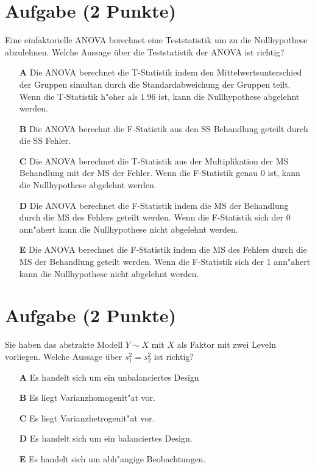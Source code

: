 \documentclass[a4paper, 10pt]{scrartcl}\usepackage[]{graphicx}\usepackage[]{xcolor}
\begin{document}
\section{Aufgabe \hfill (2 Punkte)}

Eine einfaktorielle ANOVA berechnet eine Teststatistik um zu die Nullhypothese abzulehnen. Welche Aussage {\"u}ber die Teststatistik der ANOVA ist richtig?



\begin{enumerate}
\item [\textbf{A} \msquare] Die ANOVA berechnet die T-Statistik indem den Mittelwertsunterschied der Gruppen simultan durch die Standardabweichung der Gruppen teilt. Wenn die T-Statistik h{"o}her als 1.96 ist, kann die Nullhypothese abgelehnt werden.
\item [\textbf{B} \msquare] Die ANOVA berechnt die F-Statistik aus den SS Behandlung geteilt durch die SS Fehler.
\item [\textbf{C} \msquare] Die ANOVA berechnet die T-Statistik aus der Multiplikation der MS Behandlung mit der MS der Fehler. Wenn die F-Statistik genau 0 ist, kann die Nullhypothese abgelehnt werden.
\item [\textbf{D} \msquare] Die ANOVA berechnet die F-Statistik indem die MS der Behandlung durch die MS des Fehlers geteilt werden. Wenn die F-Statistik sich der 0 ann{"a}hert kann die Nullhypothese nicht abgelehnt werden.
\item [\textbf{E} \msquare] Die ANOVA berechnet die F-Statistik indem die MS des Fehlers durch die MS der Behandlung geteilt werden. Wenn die F-Statistik sich der 1 ann{"a}hert kann die Nullhypothese nicht abgelehnt werden.
\end{enumerate} 

\section{Aufgabe \hfill (2 Punkte)}




Sie haben das abstrakte Modell $Y \sim X$ mit $X$ als Faktor mit zwei
Leveln vorliegen. Welche Aussage {\"u}ber $s^2_1 = s^2_2$ ist richtig?



\begin{enumerate}
\item [\textbf{A} \msquare] Es handelt sich um ein unbalanciertes Design
\item [\textbf{B} \msquare] Es liegt Varianzhomogenit{"a}t vor.
\item [\textbf{C} \msquare] Es liegt Varianzhetrogenit{"a}t vor.
\item [\textbf{D} \msquare] Es handelt sich um ein balanciertes Design.
\item [\textbf{E} \msquare] Es handelt sich um abh{"a}ngige Beobachtungen.
\end{enumerate} 
\end{document}

